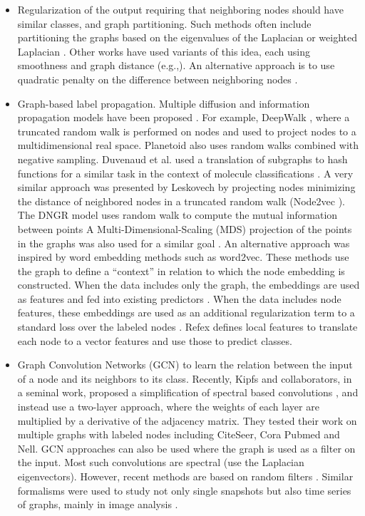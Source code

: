 \begin{itemize}
\item   Regularization of the output requiring that neighboring nodes should have similar classes, and graph partitioning. Such methods often include partitioning the graphs based on the eigenvalues of the Laplacian or weighted Laplacian \cite{dhillon2007weighted,karypis1995analysis}. Other works have used variants of this idea, each using smoothness and graph distance (e.g.,\cite{belkin2004semi,sindhwani2005linear}). An alternative approach is to use quadratic penalty on the difference between neighboring nodes \cite{zhou2004learning,zhu2003semi}.
\item   Graph-based label propagation. Multiple diffusion and information propagation models have been proposed \cite{rosenfeld2017semi}. For example, DeepWalk \cite{perozzi2014deepwalk}, where a truncated random walk is performed on nodes and used to project nodes to a multidimensional real space. Planetoid \cite{yang2016revisiting} also uses random walks combined with negative sampling. Duvenaud et al. used a translation of subgraphs to hash functions for a similar task in the context of molecule classifications \cite{duvenaud2015convolutional}. A very similar approach was presented by Leskovech by projecting nodes minimizing the distance of neighbored nodes in a truncated random walk (Node2vec \cite{grover2016node2vec}). The DNGR model \cite{cao2016deep} uses random walk to compute the mutual information between points A Multi-Dimensional-Scaling (MDS) projection of the points in the graphs was also used for a similar goal \cite{belkin2002laplacian,levy2015improving}. An alternative approach was inspired by word embedding methods \cite{mikolov2013distributed} such as word2vec. These methods use the graph to define a “context” in relation to which the node embedding is constructed. When the data includes only the graph, the embeddings are used as features and fed into existing predictors \cite{perozzi2014deepwalk}. When the data includes node features, these embeddings are used as an additional regularization term to a standard loss over the labeled nodes \cite{yang2016revisiting}. Refex \cite{henderson2011s} defines local features to translate each node to a vector features and use those to predict classes.
\item   Graph Convolution Networks (GCN) to learn the relation between the input of a node and its neighbors to its class. Recently, Kipfs and collaborators, in a seminal work, proposed a simplification of spectral based convolutions \cite{kipf2016semi,schlichtkrull2018modeling}, and instead use a two-layer approach, where the weights of each layer are multiplied by a derivative of the adjacency matrix. They tested their work on multiple graphs with labeled nodes including CiteSeer, Cora Pubmed and Nell. GCN approaches can also be used where the graph is used as a filter on the input. Most such convolutions are spectral (use the Laplacian eigenvectors). However, recent methods are based on random filters \cite{atwood2016diffusion,bruna2013spectral,henaff2015deep}. Similar formalisms were used to study not only single snapshots but also time series of graphs, mainly in image analysis \cite{seo2018structured}.


\end{itemize}
